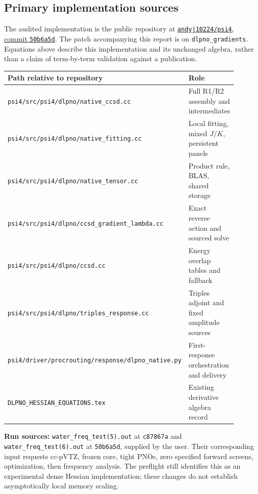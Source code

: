 \documentclass[10pt,letterpaper]{article}
\begin{document}
\subsection*{Primary implementation sources}
The audited implementation is the public repository at
\href{https://github.com/andyj10224/psi4/tree/50b6a5d75985e744687516211da73be0c09f45a4}{\texttt{andyj10224/psi4}, commit \texttt{50b6a5d}}. The patch accompanying this report is on \texttt{dlpno\_gradients}. Equations above describe this implementation and its unchanged algebra, rather than a claim of term-by-term validation against a publication.
\begin{center}\footnotesize\begin{tabular}{p{0.54\linewidth}p{0.36\linewidth}}\toprule
Path relative to repository & Role\\\midrule
\texttt{psi4/src/psi4/dlpno/native\_ccsd.cc} & Full R1/R2 assembly and intermediates\\
\texttt{psi4/src/psi4/dlpno/native\_fitting.cc} & Local fitting, mixed $J/K$, persistent panels\\
\texttt{psi4/src/psi4/dlpno/native\_tensor.cc} & Product rule, BLAS, shared storage\\
\texttt{psi4/src/psi4/dlpno/ccsd\_gradient\_lambda.cc} & Exact reverse action and sourced solve\\
\texttt{psi4/src/psi4/dlpno/ccsd.cc} & Energy overlap tables and fallback\\
\texttt{psi4/src/psi4/dlpno/triples\_response.cc} & Triples adjoint and fixed amplitude sources\\
\texttt{psi4/driver/procrouting/response/}\newline\texttt{dlpno\_native.py} & First-response orchestration and delivery\\
\texttt{DLPNO\_HESSIAN\_EQUATIONS.tex} & Existing derivative algebra record\\\bottomrule
\end{tabular}\end{center}

\textbf{Run sources:} \texttt{water\_freq\_test(5).out} at \texttt{c87867a} and \texttt{water\_freq\_test(6).out} at \texttt{50b6a5d}, supplied by the user. Their corresponding input requests cc-pVTZ, frozen core, tight PNOs, zero specified forward screens, optimization, then frequency analysis. The preflight still identifies this as an experimental dense Hessian implementation; these changes do not establish asymptotically local memory scaling.
\end{document}
